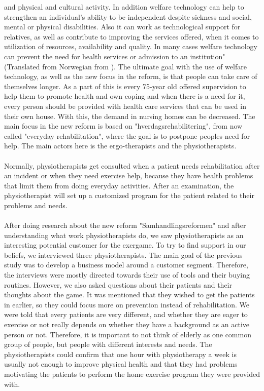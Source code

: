 and physical and cultural activity. In addition welfare technology can help to strengthen an individual's ability to be independent despite sickness and social, mental or physical disabilities. Also it can work as technological support for relatives, as well as contribute to improving the services offered, when it comes to utilization of resources, availability and quality. In many cases welfare technology can prevent the need for health services or admission to an institution" (Translated from Norwegian from \cite{welfare}). The ultimate goal with the use of welfare technology, as well as the new focus in the reform, is that people can take care of themselves longer.  As a part of this is every 75-year old offered supervision to help them to promote health and own coping and when there is a need for it, every person should be provided with health care services that can be used in their own house. With this, the demand in nursing homes can be decreased. The main focus in the new reform is based on "hverdagsrehabilitering", from now called "everyday rehabilitation", where the goal is to postpone peoples need for help. The main actors here is the ergo-therapists and the physiotherapists. \\ \\
Normally, physiotherapists get consulted when a patient needs rehabilitation after an incident or when they need exercise help, because they have health problems that limit them from doing everyday activities. After an examination, the physiotherapist will set up a customized program for the patient related to their problems and needs.\\ \\
After doing research about the new reform "Samhandlingsreformen" and after understanding what work physiotherapists do, we saw physiotherapists as an interesting potential customer for the exergame. To try to find support in our beliefs, we interviewed three physiotherapists. The main goal of the previous study was to develop a business model around a customer segment. Therefore, the interviews were mostly directed towards their use of tools and their buying routines. However, we also asked questions about their patients and their thoughts about the game. It was mentioned that they wished to get the patients in earlier, so they could focus more on prevention instead of rehabilitation. We were told that every patients are very different, and whether they are eager to exercise or not really depends on whether they have a background as an active person or not. Therefore, it is important to not think of elderly as one common group of people, but people with different interests and needs. The physiotherapists could confirm that one hour with physiotherapy a week is usually not enough to improve physical health and that they had problems motivating the patients to perform the home exercise program they were provided with. 

